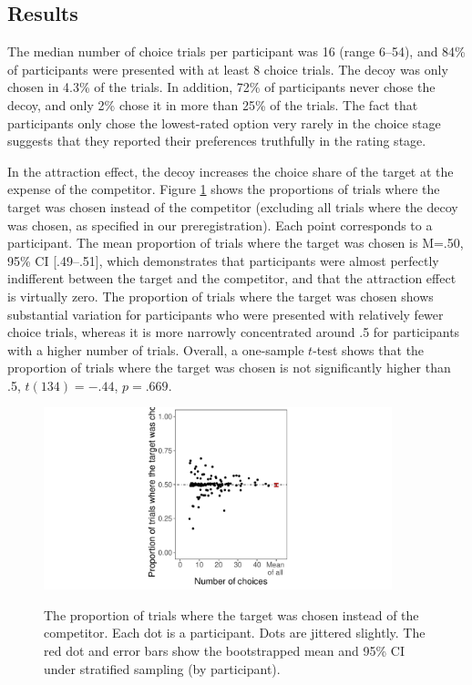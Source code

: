\documentclass[12pt, a4paper]{article}
\begin{document}
\subsection*{Results}

The median number of choice trials per participant was 16 (range 6--54), and 84\% of participants were presented with at least 8 choice trials. The decoy was only chosen in 4.3\% of the trials. In addition, 72\% of participants never chose the decoy, and only 2\% chose it in more than 25\% of the trials. The fact that participants only chose the lowest-rated option very rarely in the choice stage suggests that they reported their preferences truthfully in the rating stage. 

In the attraction effect, the decoy increases the choice share of the target at the expense of the competitor. Figure \ref{fig:exp2_res} shows the proportions of trials where the target was chosen instead of the competitor (excluding all trials where the decoy was chosen, as specified in our preregistration). Each point corresponds to a participant. The mean proportion of trials where the target was chosen is M=.50, 95\% CI [.49--.51], which demonstrates that participants were almost perfectly indifferent between the target and the competitor, and that the attraction effect is virtually zero. The proportion of trials where the target was chosen shows substantial variation for participants who were presented with relatively fewer choice trials, whereas it is more narrowly concentrated around .5 for participants with a higher number of trials. Overall, a one-sample $t$-test shows that the proportion of trials where the target was chosen is not significantly higher than .5, $t(134)=-.44$, $p=.669$. 

\begin{figure}[htb!]
\centering
		\caption{The proportion of trials where the target was chosen instead of the competitor. Each dot is a participant. Dots are jittered slightly. The red dot and error bars show the bootstrapped mean and 95\% CI under stratified sampling (by participant).}
\includegraphics[width=0.9\textwidth]{figure4.pdf}
\label{fig:exp2_res}
\end{figure}
\end{document}
